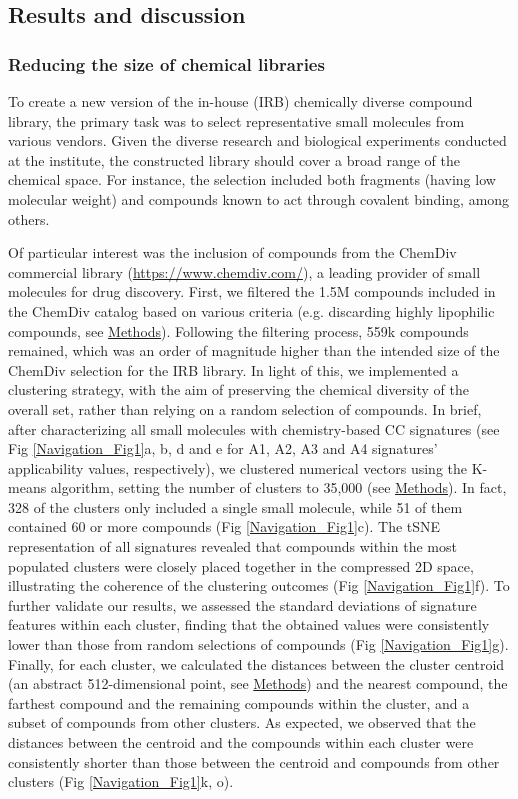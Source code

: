 \subsection{Results and discussion}

\subsubsection{Reducing the size of chemical libraries}

To create a new version of the in-house (IRB) chemically diverse compound library, the primary task was to select representative small molecules from various vendors. Given the diverse research and biological experiments conducted at the institute, the constructed library should cover a broad range of the chemical space. For instance, the selection included both fragments (having low molecular weight) and compounds known to act through covalent binding, among others. 

Of particular interest was the inclusion of compounds from the ChemDiv commercial library (\hyperlink{https://www.chemdiv.com/}{https://www.chemdiv.com/}), a leading provider of small molecules for drug discovery. First, we filtered the 1.5M compounds included in the ChemDiv catalog based on various criteria (e.g. discarding highly lipophilic compounds, see \hyperref[Navigation_Methods]{Methods}). Following the filtering process, 559k compounds remained, which was an order of magnitude higher than the intended size of the ChemDiv selection for the IRB library. In light of this, we implemented a clustering strategy, with the aim of preserving the chemical diversity of the overall set, rather than relying on a random selection of compounds. In brief, after characterizing all small molecules with chemistry-based CC signatures (see Fig \ref{Navigation_Fig1}a, b, d and e for A1, A2, A3 and A4 signatures’ applicability values, respectively), we clustered numerical vectors using the K-means algorithm, setting the number of clusters to 35,000 (see \hyperref[Navigation_Methods]{Methods}). In fact, 328 of the clusters only included a single small molecule, while 51 of them contained 60 or more compounds (Fig \ref{Navigation_Fig1}c). The tSNE representation of all signatures revealed that compounds within the most populated clusters were closely placed together in the compressed 2D space, illustrating the coherence of the clustering outcomes (Fig \ref{Navigation_Fig1}f). To further validate our results, we assessed the standard deviations of signature features within each cluster, finding that the obtained values were consistently lower than those from random selections of compounds (Fig \ref{Navigation_Fig1}g). Finally, for each cluster, we calculated the distances between the cluster centroid (an abstract 512-dimensional point, see \hyperref[Navigation_Methods]{Methods}) and the nearest compound, the farthest compound and the remaining compounds within the cluster, and a subset of compounds from other clusters. As expected, we observed that the distances between the centroid and the compounds within each cluster were consistently shorter than those between the centroid and compounds from other clusters (Fig \ref{Navigation_Fig1}k, o). 

